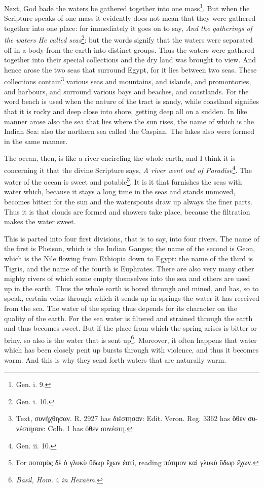 Next, God bade the waters be gathered together into one mass\footnote{Gen. i. 9.}. But when the Scripture speaks of one mass it evidently does not mean that they were gathered together into one place: for immediately it goes on to say, \emph{And the gatherings of the waters He called seas}\footnote{Gen. i. 10.}: but the words signify that the waters were separated off in a body from the earth into distinct groups. Thus the waters were gathered together into their special collections and the dry land was brought to view. And hence arose the two seas that surround Egypt, for it lies between two seas. These collections contain\footnote{Text, \textgreek{συνήχθησαν}. R. 2927 has \textgreek{διέστησαν}: Edit. Veron. Reg. 3362 has \textgreek{ὅθεν συνέστησαν}: Colb. 1 has \textgreek{ὀθεν συνέστη}.} various seas and mountains, and islands, and promontories, and harbours, and surround various bays and beaches, and coastlands. For the word beach is used when the nature of the tract is sandy, while coastland signifies that it is rocky and deep close into shore, getting deep all on a sudden. In like manner arose also the sea that lies where the sun rises, the name of which is the Indian Sea: also the northern sea called the Caspian. The lakes also were formed in the same manner.

The ocean, then, is like a river encircling the whole earth, and I think it is concerning it that the divine Scripture says, \emph{A river went out of Paradise}\footnote{Gen. ii. 10.}. The water of the ocean is sweet and potable\footnote{For \textgreek{ποταμὸς δὲ ὁ γλυκὺ ὕδωρ ἔχων ἐστί}, reading \textgreek{πότιμον καὶ γλυκὺ ὕδωρ ἔχων}.}. It is it that furnishes the seas with water which, because it stays a long time in the seas and stands unmoved, becomes bitter: for the sun and the waterspouts draw up always the finer parts. Thus it is that clouds are formed and showers take place, because the filtration makes the water sweet.

This is parted into four first divisions, that is to say, into four rivers. The name of the first is Pheison, which is the Indian Ganges; the name of the second is Geon, which is the Nile flowing from Ethiopia down to Egypt: the name of the third is Tigris, and the name of the fourth is Euphrates. There are also very many other mighty rivers of which some empty themselves into the sea and others are used up in the earth. Thus the whole earth is bored through and mined, and has, so to speak, certain veins through which it sends up in springs the water it has received from the sea. The water of the spring thus depends for its character on the quality of the earth. For the sea water is filtered and strained through the earth and thus becomes sweet. But if the place from which the spring arises is bitter or briny, so also is the water that is sent up\footnote{\emph{Basil, Hom.} 4 \emph{in Hexaëm.}}. Moreover, it often happens that water which has been closely pent up bursts through with violence, and thus it becomes warm. And this is why they send forth waters that are naturally warm.

